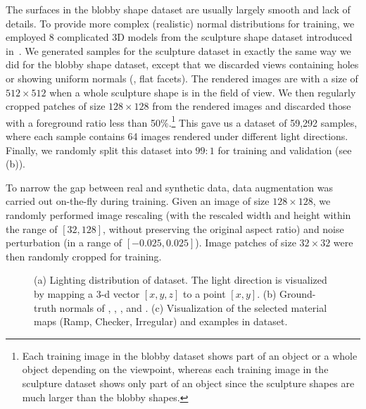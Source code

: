  The surfaces in the blobby shape dataset are usually largely smooth and lack of details. To provide more complex (realistic) normal distributions for training, we employed 8 complicated 3D models from the sculpture shape dataset introduced in~\cite{wiles2017silnet}. We generated samples for the sculpture dataset in exactly the same way we did for the blobby shape dataset, except that  we discarded views containing holes or showing uniform normals (\eg, flat facets). 
The rendered images are with a size of $512 \times 512$ when a whole sculpture shape is in the field of view.
We then regularly cropped patches of size $128 \times 128$ from the rendered images and discarded those with a foreground ratio less than 50\%.\footnote{Each training image in the blobby dataset shows part of an object or a whole object depending on the viewpoint, whereas each training image in the sculpture dataset shows only part of an object since the sculpture shapes are much larger than the blobby shapes.}
This gave us a dataset of 59,292 samples, where each sample contains 64 images rendered under different light directions. Finally, we randomly split this dataset into $99:1$ for training and validation (see (b)).

 To narrow the gap between real and synthetic data, data augmentation was carried out on-the-fly during training. Given an image of size $128\times 128$, we randomly performed image rescaling (with the rescaled width and height within the range of $[32, 128]$, without preserving the original aspect ratio) and noise perturbation (in a range of $[-0.025, 0.025]$). Image patches of size $32\times 32$ were then randomly cropped for training. 

\begin{figure}[t] \centering
    
    \caption[Illustration of the synthetic test dataset \syntestMERL]{(a) Lighting distribution of \syntestMERL dataset. The light direction is visualized by mapping a $3$-d vector $[x,y,z]$ to a point $[x,y]$. (b) Ground-truth normals of , , , and . (c) Visualization of the selected material maps (Ramp, Checker, Irregular) and examples in \dragonSVBRDF dataset.} \label{fig:syn_test_sample}
\end{figure}


